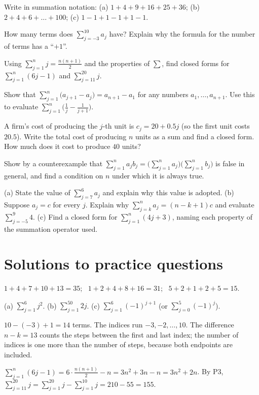 \pq[basic] Write in summation notation: (a) $1+4+9+16+25+36$; (b) $2+4+6+\dots+100$; (c) $1-1+1-1+1-1$.

\pq[conceptual] How many terms does $\sum_{j=-3}^{10}a_j$ have? Explain why the formula for the number of terms
has a ``$+1$''.

\pq[mathematical] Using $\sum_{j=1}^n j=\frac{n(n+1)}{2}$ and the properties of $\sum$, find closed forms for
$\sum_{j=1}^{n}(6j-1)$ and $\sum_{j=11}^{20}j$.

\pq[mathematical] Show that $\sum_{j=1}^{n}\big(a_{j+1}-a_j\big)=a_{n+1}-a_1$ for any numbers $a_1,\dots,a_{n+1}$.
Use this to evaluate $\sum_{j=1}^{n}\Big(\frac{1}{j}-\frac{1}{j+1}\Big)$.

\pq[application] A firm's cost of producing the $j$-th unit is $c_j=20+0.5j$ (so the first unit costs $20.5$). Write
the total cost of producing $n$ units as a sum and find a closed form. How much does it cost to produce $40$ units?

 Show by a counterexample that $\sum_{j=1}^{n}a_jb_j=\Big(\sum_{j=1}^{n}a_j\Big)\Big(\sum_{j=1}^{n}b_j\Big)$
is false in general, and find a condition on $n$ under which it is always true.

 (a) State the value of $\sum_{j=7}^{6}a_j$ and explain why this value is adopted.
(b) Suppose $a_j=c$ for every $j$. Explain why $\sum_{j=k}^{n}a_j=(n-k+1)c$ and evaluate $\sum_{j=-5}^{9}4$.
(c) Find a closed form for $\sum_{j=1}^{n}(4j+3)$, naming each property of the summation operator used.

\section{Solutions to practice questions}
$1+4+7+10+13=35$; \ $1+2+4+8+16=31$; \ $5+2+1+2+5=15$.

(a) $\sum_{j=1}^{6}j^2$. (b) $\sum_{j=1}^{50}2j$. (c) $\sum_{j=1}^{6}(-1)^{j+1}$ (or $\sum_{j=0}^{5}(-1)^j$).

$10-(-3)+1=14$ terms. The indices run $-3,-2,\dots,10$. The difference $n-k=13$ counts the steps between the first
and last index; the number of indices is one more than the number of steps, because both endpoints are included.

$\sum_{j=1}^{n}(6j-1)=6\cdot\frac{n(n+1)}2-n=3n^2+3n-n=3n^2+2n$.
By P3, $\sum_{j=11}^{20}j=\sum_{j=1}^{20}j-\sum_{j=1}^{10}j=210-55=155$.

